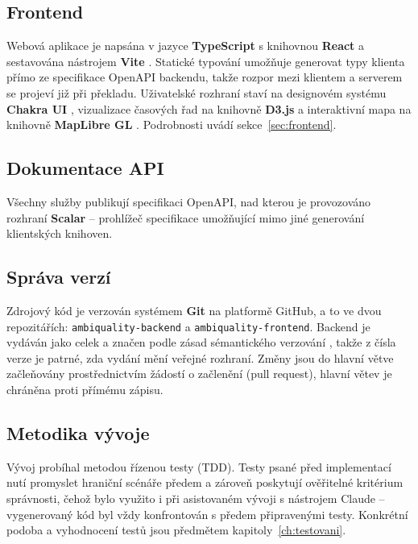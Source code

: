 \subsection{Frontend}

Webová aplikace je napsána v jazyce \textbf{TypeScript} \parencite{JavaScriptSyntaxTypes} s knihovnou \textbf{React} \parencite{React} a sestavována nástrojem \textbf{Vite} \parencite{Vite}. Statické typování umožňuje generovat typy klienta přímo ze specifikace OpenAPI backendu, takže rozpor mezi klientem a serverem se projeví již při překladu. Uživatelské rozhraní staví na designovém systému \textbf{Chakra UI} \parencite{ChakraUI}, vizualizace časových řad na knihovně \textbf{D3.js} \parencite{D3ObservableJavaScript} a interaktivní mapa na knihovně \textbf{MapLibre GL} \parencite{maplibreMapLibre}. Podrobnosti uvádí sekce~\ref{sec:frontend}.

\subsection{Dokumentace API}

Všechny služby publikují specifikaci OpenAPI, nad kterou je provozováno rozhraní \textbf{Scalar} \parencite{ScalarAPICompany} -- prohlížeč specifikace umožňující mimo jiné generování klientských knihoven.

\subsection{Správa verzí}

Zdrojový kód je verzován systémem \textbf{Git} na platformě GitHub, a to ve dvou repozitářích: \texttt{ambiquality-backend} a \texttt{ambiquality-frontend}. Backend je vydáván jako celek a značen podle zásad sémantického verzování \parencite{preston-wernerSemanticVersioning200}, takže z čísla verze je patrné, zda vydání mění veřejné rozhraní. Změny jsou do hlavní větve začleňovány prostřednictvím žádostí o začlenění (pull request), hlavní větev je chráněna proti přímému zápisu.

\subsection{Metodika vývoje}

Vývoj probíhal metodou řízenou testy (TDD). Testy psané před implementací nutí promyslet hraniční scénáře předem a zároveň poskytují ověřitelné kritérium správnosti, čehož bylo využito i při asistovaném vývoji s nástrojem Claude -- vygenerovaný kód byl vždy konfrontován s předem připravenými testy. Konkrétní podoba a vyhodnocení testů jsou předmětem kapitoly~\ref{ch:testovani}.

